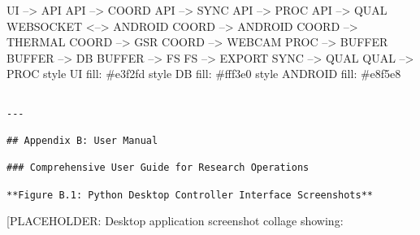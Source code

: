 \documentclass[12pt,a4paper]{report}
\begin{document}
    UI --> API
    API --> COORD
    API --> SYNC
    API --> PROC
    API --> QUAL
    WEBSOCKET <--> ANDROID
    COORD --> ANDROID
    COORD --> THERMAL
    COORD --> GSR
    COORD --> WEBCAM
    PROC --> BUFFER
    BUFFER --> DB
    BUFFER --> FS
    FS --> EXPORT
    SYNC --> QUAL
    QUAL --> PROC
    style UI fill: \#e3f2fd
    style DB fill: \#fff3e0
    style ANDROID fill: \#e8f5e8
\begin{verbatim}

---

## Appendix B: User Manual

### Comprehensive User Guide for Research Operations

**Figure B.1: Python Desktop Controller Interface Screenshots**

\end{verbatim}
[PLACEHOLDER: Desktop application screenshot collage showing:
\end{document}

